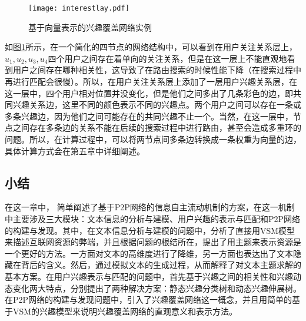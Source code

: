 \begin{figure}
\centering
\texttt{[image: interestlay.pdf]}
\caption{基于向量表示的兴趣覆盖网络实例}
\label{fig:interestlay}
\end{figure}

如图\ref{fig:interestlay}所示，在一个简化的四节点的网络结构中，可以看到在用户关注关系层上，$u_1,u_2,u_3,u_4$四个用户之间存在着单向的关注关系，但是在这一层上不能直观地看到用户之间存在哪种相关性，这导致了在路由搜索的时候性能下降（在搜索过程中再进行匹配会很慢）。所以，在用户关注关系层上添加了一层用户兴趣关系层，在这一层中，四个用户相对位置并没变化，但是他们之间多出了几条彩色的边，即共同兴趣关系边，这里不同的颜色表示不同的兴趣点。两个用户之间可以存在一条或多条兴趣边，因为他们之间可能存在的共同兴趣不止一个。当然，在这一层中，节点之间存在多条边的关系不能在后续的搜索过程中进行路由，甚至会造成多重环的问题。所以，在计算过程中，可以将两节点间多条边转换成一条权重为向量的边，具体计算方式会在第五章中详细阐述。

\subsection{小结}
在这一章中， 简单阐述了基于P2P网络的信息自主流动机制的方案，在这一机制中主要涉及三大模块：文本信息的分析与建模、用户兴趣的表示与匹配和P2P网络的构建与发现。其中，在文本信息分析与建模的问题中，分析了直接用VSM模型来描述互联网资源的弊端，并且根据问题的根结所在，提出了用主题来表示资源是一个更好的方法。一方面对文本的高维度进行了降维，另一方面也表达出了文本隐藏在背后的含义。然后，通过模拟文本的生成过程，从而解释了对文本主题求解的基本方案。在用户兴趣表示与匹配的问题中，首先基于兴趣之间的相关性和兴趣动态变化两大特点，分别提出了两种解决方案：静态兴趣分类树和动态兴趣伸展树。在P2P网络的构建与发现问题中，引入了兴趣覆盖网络这一概念，并且用简单的基于VSM的兴趣模型来说明兴趣覆盖网络的直观意义和表示方法。
